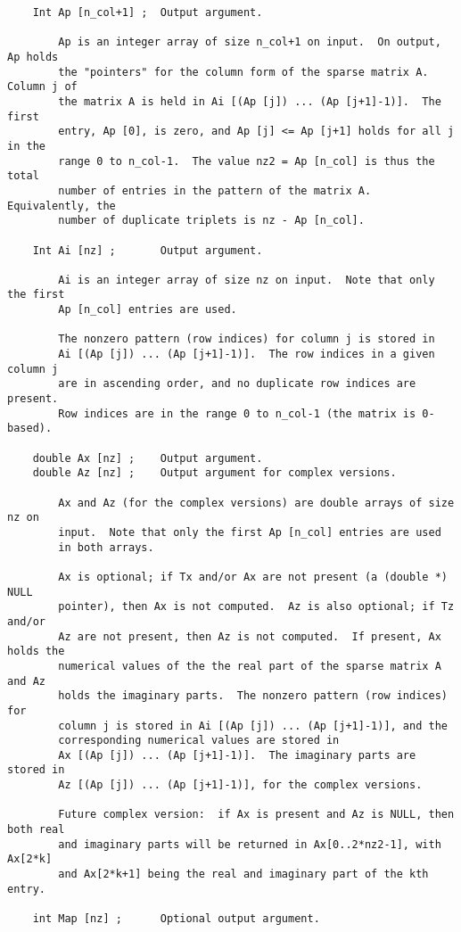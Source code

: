 {\begin{verbatim}
    Int Ap [n_col+1] ;  Output argument.

        Ap is an integer array of size n_col+1 on input.  On output, Ap holds
        the "pointers" for the column form of the sparse matrix A.  Column j of
        the matrix A is held in Ai [(Ap [j]) ... (Ap [j+1]-1)].  The first
        entry, Ap [0], is zero, and Ap [j] <= Ap [j+1] holds for all j in the
        range 0 to n_col-1.  The value nz2 = Ap [n_col] is thus the total
        number of entries in the pattern of the matrix A.  Equivalently, the
        number of duplicate triplets is nz - Ap [n_col].

    Int Ai [nz] ;       Output argument.

        Ai is an integer array of size nz on input.  Note that only the first
        Ap [n_col] entries are used.

        The nonzero pattern (row indices) for column j is stored in
        Ai [(Ap [j]) ... (Ap [j+1]-1)].  The row indices in a given column j
        are in ascending order, and no duplicate row indices are present.
        Row indices are in the range 0 to n_col-1 (the matrix is 0-based).

    double Ax [nz] ;    Output argument.
    double Az [nz] ;    Output argument for complex versions.

        Ax and Az (for the complex versions) are double arrays of size nz on
        input.  Note that only the first Ap [n_col] entries are used
        in both arrays.

        Ax is optional; if Tx and/or Ax are not present (a (double *) NULL
        pointer), then Ax is not computed.  Az is also optional; if Tz and/or
        Az are not present, then Az is not computed.  If present, Ax holds the
        numerical values of the the real part of the sparse matrix A and Az
        holds the imaginary parts.  The nonzero pattern (row indices) for
        column j is stored in Ai [(Ap [j]) ... (Ap [j+1]-1)], and the
        corresponding numerical values are stored in
        Ax [(Ap [j]) ... (Ap [j+1]-1)].  The imaginary parts are stored in
        Az [(Ap [j]) ... (Ap [j+1]-1)], for the complex versions.

        Future complex version:  if Ax is present and Az is NULL, then both real
        and imaginary parts will be returned in Ax[0..2*nz2-1], with Ax[2*k]
        and Ax[2*k+1] being the real and imaginary part of the kth entry.

    int Map [nz] ;      Optional output argument.


\end{verbatim}}
